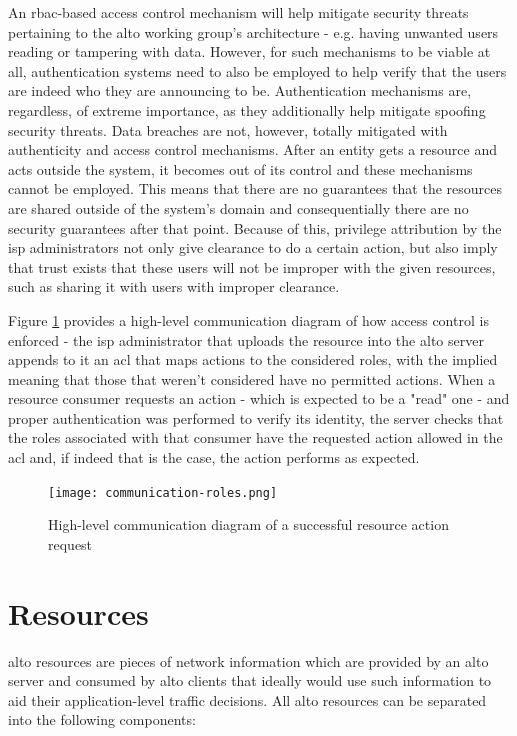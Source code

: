     An \gls{rbac}-based access control mechanism will help mitigate security threats pertaining to the \gls{alto} working group's architecture - e.g. having unwanted users reading or tampering with data.
    However, for such mechanisms to be viable at all, authentication systems need to also be employed to help verify that the users are indeed who they are announcing to be.
    Authentication mechanisms are, regardless, of extreme importance, as they additionally help mitigate spoofing security threats.
    Data breaches are not, however, totally mitigated with authenticity and access control mechanisms.
    After an entity gets a resource and acts outside the system, it becomes out of its control and these mechanisms cannot be employed.
    This means that there are no guarantees that the resources are shared outside of the system's domain and consequentially there are no security guarantees after that point.
    Because of this, privilege attribution by the \gls{isp} administrators not only give clearance to do a certain action, but also imply that trust exists that these users will not be improper with the given resources, such as sharing it with users with improper clearance.

    Figure \ref{fig:communication-roles} provides a high-level communication diagram of how access control is enforced - the \gls{isp} administrator that uploads the resource into the \gls{alto} server appends to it an \gls{acl} that maps actions to the considered roles, with the implied meaning that those that weren't considered have no permitted actions.
    When a resource consumer requests an action - which is expected to be a "read" one - and proper authentication was performed to verify its identity, the server checks that the roles associated with that consumer have the requested action allowed in the \gls{acl} and, if indeed that is the case, the action performs as expected.

\begin{figure}[H]
        \centering
        \texttt{[image: communication-roles.png]}
        \caption{High-level communication diagram of a successful resource action request}
        \label{fig:communication-roles}
\end{figure}

\section{Resources}
\label{sec:alto-resources}

    \gls{alto} resources are pieces of network information which are provided by an \gls{alto} server and consumed by \gls{alto} clients that ideally would use such information to aid their application-level traffic decisions.
    All \gls{alto} resources can be separated into the following components:

